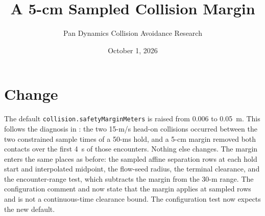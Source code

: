 \documentclass[11pt]{article}
\title{A 5-cm Sampled Collision Margin}
\author{Pan Dynamics Collision Avoidance Research}
\date{October 1, 2026}
\begin{document}
\maketitle

\section{Change}
The default \texttt{collision.safetyMarginMeters} is raised from 0.006 to
0.05~m. This follows the diagnosis in
: the two 15-m/s head-on collisions
occurred between the two constrained sample times of a 50-ms hold, and a 5-cm
margin removed both contacts over the first 4~s of those encounters. Nothing
else changes. The margin enters the same places as before: the sampled affine
separation rows at each hold start and interpolated midpoint, the flow-seed
radius, the terminal clearance, and the encounter-range test, which subtracts
the margin from the 30-m range. The configuration comment and
 now state that the margin applies
at sampled rows and is not a continuous-time clearance bound. The configuration
test now expects the new default.
\end{document}
